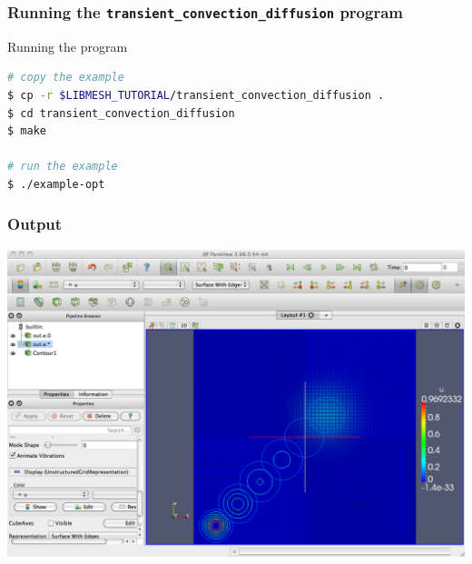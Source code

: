 \begin{frame}[fragile]
  \frametitle{Running the \texttt{transient\_convection\_diffusion} program}
    \begin{block}{Running the program}
    \begin{lstlisting}[language=bash]
# copy the example
$ cp -r $LIBMESH_TUTORIAL/transient_convection_diffusion .
$ cd transient_convection_diffusion
$ make

# run the example
$ ./example-opt
    \end{lstlisting}
  \end{block}
\end{frame}


\frame
{
  \frametitle{Output}
  \begin{center}
    \includegraphics[height=0.8\textheight]{tutorial/transient_convection_diffusion/screen}
  \end{center}
} 

